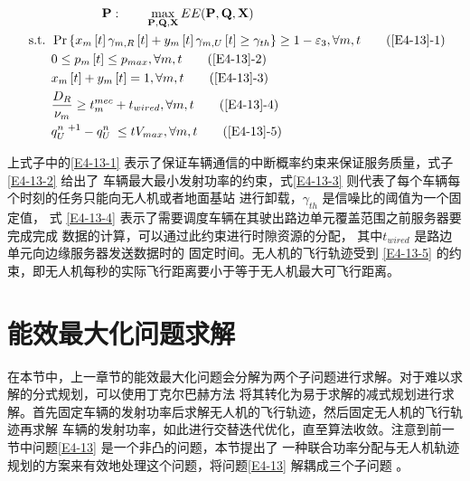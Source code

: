 \begin{align}
& \qquad\qquad\textbf{P}:\qquad \max_{ \mathbf{P}, \mathbf{Q}, \mathbf{X} }  EE(\mathbf{P}, \mathbf{Q}, \mathbf{X})                \label{E4-13}\\
\text { s.t. }                                                                                                                                              
& \Pr\left\{x_m\left[t\right]\gamma_{m,R}\left[t\right]+y_m\left[t\right]\gamma_{m,U}\left[t\right]\geq \gamma_{th}\right\}\geq1-\varepsilon_3, \forall m,t   \tag{\ref{E4-13}{-1}}      \label{E4-13-1}\\  %
& 0\le p_m\left[t\right]\le p_{max}, \forall m,t                                                                                                              \tag{\ref{E4-13}{-2}}      \label{E4-13-2}\\  %
& x_m\left[t\right] + y_m\left[t\right]=1, \forall m,t                                                                                                        \tag{\ref{E4-13}{-3}}      \label{E4-13-3}\\  %
& \frac{D_R}{\nu_m} \geq t_{m}^{mec}+t_{wired} , \forall m,t                                                                                                  \tag{\ref{E4-13}{-4}}      \label{E4-13-4}\\  %
& q_U^{n\mathrm{\ }+1}-q_U^{n\mathrm{\ }}\le tV_{max}, \forall m,t                                                                                            \tag{\ref{E4-13}{-5}}      \label{E4-13-5}    %
\end{align}

上式子中的\eqref{E4-13-1} 表示了保证车辆通信的中断概率约束来保证服务质量，式子\eqref{E4-13-2} 给出了
车辆最大最小发射功率的约束，式\eqref{E4-13-3} 则代表了每个车辆每个时刻的任务只能向无人机或者地面基站
进行卸载，$\gamma_{th}$ 是信噪比的阈值为一个固定值，%
式 \eqref{E4-13-4} 表示了需要调度车辆在其驶出路边单元覆盖范围之前服务器要完成完成
数据的计算，可以通过此约束进行时隙资源的分配，
其中$t_{wired}$ 是路边单元向边缘服务器发送数据时的
固定时间。无人机的飞行轨迹受到 \eqref{E4-13-5} 的约束，即无人机每秒的实际飞行距离要小于等于无人机最大可飞行距离。
\section{能效最大化问题求解}\label{section4-3}
在本节中，上一章节的能效最大化问题会分解为两个子问题进行求解。对于难以求解的分式规划，可以使用丁克尔巴赫方法
将其转化为易于求解的减式规划进行求解。首先固定车辆的发射功率后求解无人机的飞行轨迹，然后固定无人机的飞行轨迹再求解
车辆的发射功率，如此进行交替迭代优化，直至算法收敛。注意到前一节中问题\eqref{E4-13} 是一个非凸的问题，本节提出了
一种联合功率分配与无人机轨迹规划的方案来有效地处理这个问题，将问题\eqref{E4-13} 解耦成三个子问题 \supercite{JointTrajectory9627548}。
